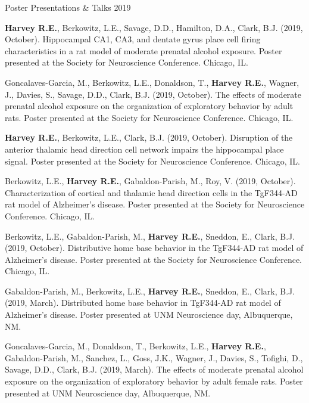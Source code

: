 


\begin{cventries}
\cventry
    {Poster Presentations \& Talks} %
    {} %
    {} %
    {2019} %
    {
      \begin{cvitems} %
      \setlength\itemsep{0.4em}
        \item {\textbf{Harvey R.E.}, Berkowitz, L.E., Savage, D.D., Hamilton, D.A., Clark, B.J. (2019, October). Hippocampal CA1, CA3, and dentate gyrus place cell firing characteristics in a rat model of moderate prenatal alcohol exposure. Poster presented at the Society for Neuroscience Conference. Chicago, IL.} 
        \item {Goncalaves-Garcia, M., Berkowitz, L.E., Donaldson, T., \textbf{Harvey R.E.}, Wagner, J., Davies, S., Savage, D.D., Clark, B.J. (2019, October). The effects of moderate prenatal alcohol exposure on the organization of exploratory behavior by adult rats. Poster presented at the Society for Neuroscience Conference. Chicago, IL.}
        \item {\textbf{Harvey R.E.}, Berkowitz, L.E., Clark, B.J. (2019, October). Disruption of the anterior thalamic head direction cell network impairs the hippocampal place signal. Poster presented at the Society for Neuroscience Conference. Chicago, IL.}
        \item {Berkowitz, L.E., \textbf{Harvey R.E.}, Gabaldon-Parish, M., Roy, V. (2019, October). Characterization of cortical and thalamic head direction cells in the TgF344-AD rat model of Alzheimer’s disease. Poster presented at the Society for Neuroscience Conference. Chicago, IL.}
        \item {Berkowitz, L.E., Gabaldon-Parish, M., \textbf{Harvey R.E.}, Sneddon, E., Clark, B.J. (2019, October). Distributive home base behavior in the TgF344-AD rat model of Alzheimer’s disease. Poster presented at the Society for Neuroscience Conference. Chicago, IL.}
        \item {Gabaldon-Parish, M., Berkowitz, L.E., \textbf{Harvey R.E.}, Sneddon, E., Clark, B.J. (2019, March). Distributed home base behavior in TgF344-AD rat model of Alzheimer’s disease. Poster presented at UNM Neuroscience day, Albuquerque, NM.}
        \item {Goncalaves-Garcia, M., Donaldson, T., Berkowitz, L.E., \textbf{Harvey R.E.}, Gabaldon-Parish, M., Sanchez, L., Goss, J.K., Wagner, J., Davies, S., Tofighi, D., Savage, D.D., Clark, B.J. (2019, March). The effects of moderate prenatal alcohol exposure on the organization of exploratory behavior by adult female rats. Poster presented at UNM Neuroscience day, Albuquerque, NM.}
      \end{cvitems}
    }
\end{cventries}

